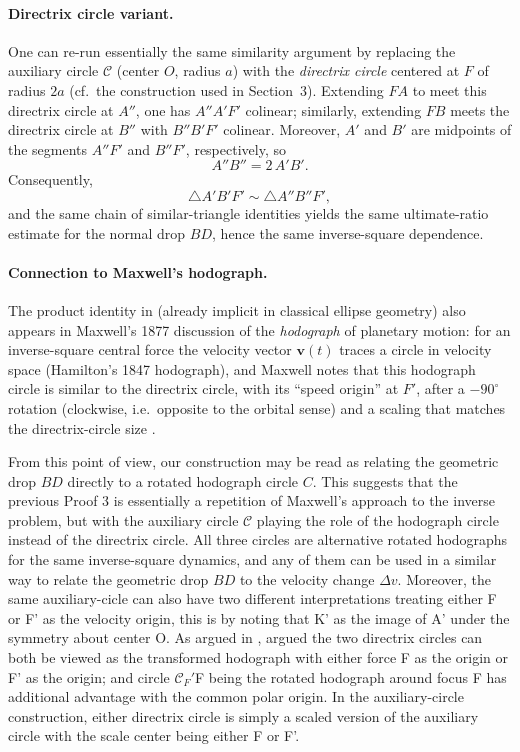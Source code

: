 \paragraph{Directrix circle variant.}
One can re-run essentially the same similarity argument by replacing the auxiliary circle $\mathcal C$ (center $O$, radius $a$) with the \emph{directrix circle} centered at $F$ of radius $2a$ (cf.\ the construction used in Section~3).
Extending $FA$ to meet this directrix circle at $A''$, one has $A''A'F'$ colinear; similarly, extending $FB$ meets the directrix circle at $B''$ with $B''B'F'$ colinear.
Moreover, $A'$ and $B'$ are midpoints of the segments $A''F'$ and $B''F'$, respectively, so
\begin{equation}
  A''B'' = 2\,A'B'.
\end{equation}
Consequently,
\begin{equation}
  \triangle A'B'F' \sim \triangle A''B''F',
\end{equation}
and the same chain of similar-triangle identities yields the same ultimate-ratio estimate for the normal drop $BD$, hence the same inverse-square dependence.

\paragraph{Connection to Maxwell's hodograph.}
The product identity in  (already implicit in classical ellipse geometry) also appears in Maxwell's 1877 discussion of the \emph{hodograph} of planetary motion: for an inverse-square central force the velocity vector $\mathbf v(t)$ traces a circle in velocity space (Hamilton's 1847 hodograph), and Maxwell notes that this hodograph circle is similar to the directrix circle, with its ``speed origin'' at $F'$, after a \(-90^\circ\) rotation (clockwise, i.e.\ opposite to the orbital sense) and a scaling that matches the directrix-circle size \cite{maxwell1877mattermotion}.

From this point of view, our construction may be read as relating the geometric drop $BD$ directly to a rotated hodograph circle $C$.
This suggests that the previous Proof 3 is essentially a repetition of Maxwell's approach to the inverse problem, but with the auxiliary circle $\mathcal{C}$ playing the role of the hodograph circle instead of the directrix circle. All three circles are alternative rotated hodographs for the same inverse-square dynamics, and any of them can be used in a similar way to relate the geometric drop $BD$ to the velocity change $\Delta v$. Moreover, the same auxiliary-cicle can also have two different interpretations treating either F or F' as the velocity origin, this is by noting that K' as the image of A' under the symmetry about center O. As argued in \cite{carinena2016newlook}, argued the two directrix circles can both be viewed as the transformed hodograph with either force F as the origin or F' as the origin; and circle $\mathcal{C}_F'$F being the rotated hodograph around focus F has additional advantage with the common polar origin. In the auxiliary-circle construction, either directrix circle is simply a scaled version of the auxiliary circle with the scale center being either F or F'.
